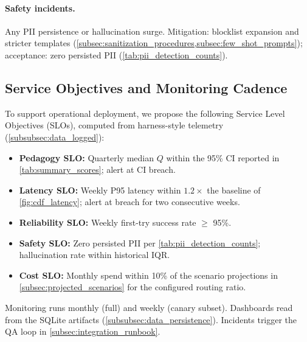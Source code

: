 \paragraph{Safety incidents.} Any PII persistence or hallucination surge. Mitigation: blocklist expansion and stricter templates (\cref{subsec:sanitization_procedures,subsec:few_shot_prompts}); acceptance: zero persisted PII (\cref{tab:pii_detection_counts}).

\subsection{Service Objectives and Monitoring Cadence}
\label{subsec:slos_monitoring}

To support operational deployment, we propose the following Service Level Objectives (SLOs), computed from harness-style telemetry (\cref{subsubsec:data_logged}):

\begin{itemize}
	\item \textbf{Pedagogy SLO:} Quarterly median $Q$ within the 95\% CI reported in \cref{tab:summary_scores}; alert at CI breach.
	\item \textbf{Latency SLO:} Weekly P95 latency within $1.2\times$ the baseline of \cref{fig:cdf_latency}; alert at breach for two consecutive weeks.
	\item \textbf{Reliability SLO:} Weekly first-try success rate $\geq$ 95\%.
	\item \textbf{Safety SLO:} Zero persisted PII per \cref{tab:pii_detection_counts}; hallucination rate within historical IQR.
	\item \textbf{Cost SLO:} Monthly spend within 10\% of the scenario projections in \cref{subsec:projected_scenarios} for the configured routing ratio.
\end{itemize}

Monitoring runs monthly (full) and weekly (canary subset). Dashboards read from the SQLite artifacts (\cref{subsubsec:data_persistence}). Incidents trigger the QA loop in \cref{subsec:integration_runbook}.
